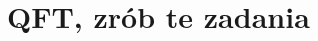 \documentclass[a4paper,11pt]{article}
\begin{document}
\begin{enumerate}










\end{enumerate}










\section{QFT, zrób te zadania}


\end{document}
